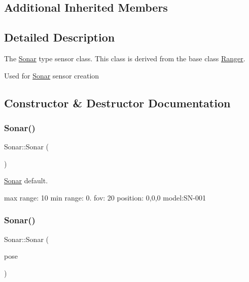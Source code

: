 \subsection*{Additional Inherited Members}


\subsection{Detailed Description}
The \hyperlink{classSonar}{Sonar} type sensor class. This class is derived from the base class \hyperlink{classRanger}{Ranger}. 

Used for \hyperlink{classSonar}{Sonar} sensor creation 

\subsection{Constructor \& Destructor Documentation}
\mbox{\label{classSonar_a71ef009d138f1e372fc35ca0cb6e85e2}} 
\subsubsection{\texorpdfstring{Sonar()}{Sonar()}\hspace{0.1cm}{\footnotesize\ttfamily [1/3]}}
{\footnotesize\ttfamily Sonar\+::\+Sonar (\begin{DoxyParamCaption}{ }\end{DoxyParamCaption})}



\hyperlink{classSonar}{Sonar} default. 

max range\+: 10 min range\+: 0. fov\+: 20 position\+: 0,0,0 model\+:S\+N-\/001 \mbox{\label{classSonar_a810fa5faf9ddee8ffd09c77556efda0c}} 
\subsubsection{\texorpdfstring{Sonar()}{Sonar()}\hspace{0.1cm}{\footnotesize\ttfamily [2/3]}}
{\footnotesize\ttfamily Sonar\+::\+Sonar (\begin{DoxyParamCaption}\item[{\hyperlink{structranger_1_1SensorPose}{ranger\+::\+Sensor\+Pose}}]{pose }\end{DoxyParamCaption})}



